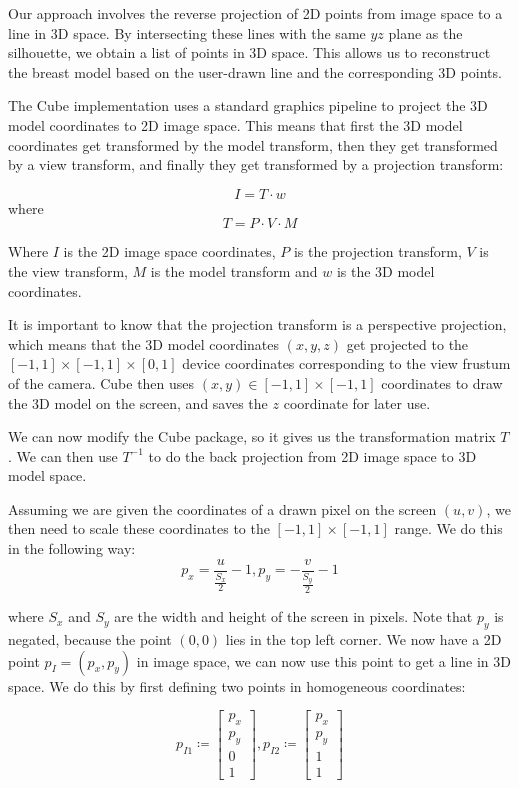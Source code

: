 Our approach involves the reverse projection of 2D points from image space to a line in 3D space. By intersecting these lines with the same $yz$ plane as the silhouette, we obtain a list of points in 3D space. 
This allows us to reconstruct the breast model based on the user-drawn line and the corresponding 3D points.

The Cube implementation uses a standard graphics pipeline to project the 3D model coordinates to 2D image space. This means that first the 3D model coordinates get transformed by the model transform, then
they get transformed by a view transform, and finally they get transformed by a projection transform:

\[
    I = T \cdot w
\]
where 
\[
    T = P \cdot V \cdot M
\]

Where $I$ is the 2D image space coordinates, $P$ is the projection transform, $V$ is the view transform, $M$ is the model transform and $w$ is the 3D model coordinates. 

It is important to know that the projection transform is a perspective projection, which means that the 3D model coordinates $(x,y,z)$ get projected to the $[-1,1] \times [-1,1] \times [0,1]$ device coordinates corresponding to the
view frustum of the camera. Cube then uses $(x,y) \in [-1,1] \times [-1,1]$ coordinates to draw the 3D model on the screen, and saves the $z$ coordinate for later use.

We can now modify the Cube package, so it gives us the transformation matrix $T$. We can then use $T^{-1}$ to do the back projection from 2D image space to 3D model space.

Assuming we are given the coordinates of a drawn pixel on the screen $(u,v)$, we then need to scale these coordinates to the $[-1,1] \times [-1,1]$ range. We do this in the following way:
\[
    p_x = \frac{u}{\frac{S_x}{2}} - 1, p_y = -\frac{v}{\frac{S_y}{2}} - 1 
\]

where $S_x$ and $S_y$ are the width and height of the screen in pixels. Note that $p_y$ is negated, because the point $(0,0)$ lies in the top left corner. We now have a 2D point $p_I = (p_x,p_y)$ in image space, we can now use this point to get a line in 3D space. 
We do this by first defining two points in homogeneous coordinates:

\[
    p_{I1} \coloneqq 
    \begin{bmatrix}
        p_x \\ p_y \\ 0 \\ 1
    \end{bmatrix},
    p_{I2} \coloneqq
    \begin{bmatrix}
        p_x \\ p_y \\ 1 \\ 1
    \end{bmatrix}
\]

